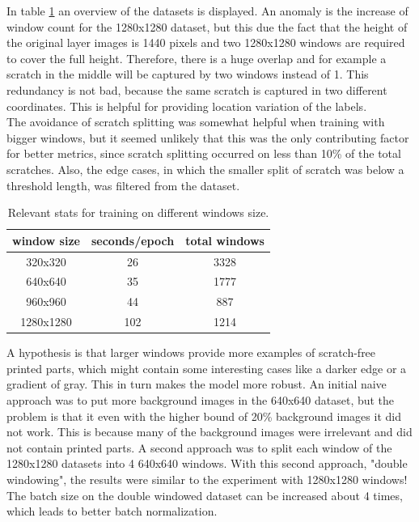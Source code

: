  In table \ref{win_size_training} an overview of the datasets is displayed. An anomaly is the increase of window count for the 1280x1280 dataset, but this due the fact that the height of the original layer images is 1440 pixels and two 1280x1280 windows are required to cover the full height. Therefore, there is a huge overlap and for example a scratch in the middle will be captured by two windows instead of 1. This redundancy is not bad, because the same scratch is captured in two different coordinates. This is helpful for providing location variation of the labels.  \\
The avoidance of scratch splitting was somewhat helpful when training with bigger windows, but it seemed unlikely that this was the only contributing factor for better metrics, since scratch splitting occurred on less than 10\% of the total scratches. Also, the edge cases, in which the smaller split of scratch was below a threshold length, was filtered from the dataset. \\

\begin{table}
  \centering
    \begin{tabular}{ ||c|c|c||}
    \hline
    window size & seconds/epoch & total windows\\ [0.5ex]
    \hline\hline
    320x320 & 26 & 3328 \\
    640x640 & 35 & 1777 \\
    960x960 & 44 & 887 \\
    1280x1280 & 102 & 1214 \\
    \hline
    \end{tabular}
  \caption{Relevant stats for training on different windows size.}
  \label{win_size_training}
\end{table}

 A hypothesis is that larger windows provide more examples of scratch-free printed parts, which might contain some interesting cases like a darker edge or a gradient of gray. This in turn makes the model more robust. An initial naive approach was to put more background images in the 640x640 dataset, but the problem is that it even with the higher bound of 20\% background images it did not work. This is because many of the background images were irrelevant and did not contain printed parts. A second approach was to split each window of the 1280x1280 datasets into 4 640x640 windows. With this second approach, "double windowing", the results were similar to the experiment with 1280x1280 windows! The batch size on the double windowed dataset can be increased about 4 times, which leads to better batch normalization. \\

